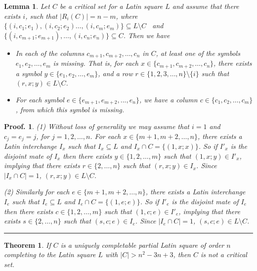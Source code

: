 \documentclass[12pt]{report}
\newtheorem{theorem}{Theorem}
\newtheorem{lemma}{Lemma}
\newtheorem{preproof}{{\bf Proof.}}
\newenvironment{proof}[1]{\begin{preproof}{\rm
               #1}\hfill{\rule[-0.5mm]{2mm}{2mm}}}{\end{preproof}}
\begin{document}
\begin{lemma}
\label{3.2}
Let $C$ be a critical set for a Latin square $L$ and assume that
there exists $i$, such that
$|R_i(C)| = n-m$, where
$\{(i, c_1; e_1), (i, c_2; e_2)\dots, (i, c_m; e_m) \}
\subseteq L\setminus C$ \  and
$\{(i,c_{m+1};e_{m+1}), \dots, (i, c_n; e_n) \}\subseteq  C$.
Then we have
\begin{itemize}
%
\item[$(1)$]
In each of the columns $c_{m+1},c_{m+2}, \dots, c_n$ in $C$, at least
one of the symbols $e_1, e_2, \dots, e_m$ is missing.
That is, for each $x \in \{c_{m+1}, c_{m+2}, \dots, c_n \}$,
there exists a symbol $y \in \{e_1, e_2, \dots, e_m \}$, and a row
$r \in \{1,2, 3, \dots, n \}\setminus \{i\}$
such that $(r, x; y)  \in L\setminus C$.
%
\item[$(2)$]
For each symbol $e \in \{e_{m+1},e_{m+2}, ..., e_n\}$, we have
a column $c \in \{c_1, c_2, \dots, c_m \}$, from which
this symbol is missing.
\end{itemize}
\end{lemma}
%
\begin{proof}{(1)
Without loss of generality we may assume that $i=1$ and $c_j = e_j = j$, for
$j = 1,2, \dots, n$.
For each $x \in \{m+1, m+2, \dots, n \}$,
there exists a Latin interchange $I_x$ such that
$I_x\subseteq L$ and $I_x \cap C = \{ (1, x;x) \}$.
So if $I'_x$ is the disjoint mate of $I_x$ then there exists
$y \in \{1, 2, \dots, m \}$ such that $(1,x;y) \in I'_x$, implying that
there exists $r \in \{ 2, \dots, n \}$ such that $(r,x;y) \in I_x$.
Since $|I_x \cap C| = 1$, $(r,x;y) \in L\setminus C$.

\noindent
(2) Similarly
for each $e \in \{m+1, m+2, \dots, n \}$,
there exists a Latin interchange $I_e$ such that
$I_e\subseteq L$ and $I_e \cap C = \{ (1, e;e) \}$.
So if $I'_e$ is the disjoint mate of $I_e$ then there exists
$c \in \{1, 2, \dots, m \}$ such that $(1,c;e) \in I'_e$, implying that
there exists $s \in \{ 2, \dots, n \}$ such that $(s,c;e) \in I_e$.
Since $|I_e \cap C| = 1$, $(s,c;e) \in L\setminus C$.
}\end{proof}
%
\begin{theorem}
\label{th3.1}
If $C$ is a uniquely completable partial Latin square of order $n$
completing to the Latin square $L$
with $| C | > n^2-3n+3$, then $C$ is not a critical set.
\end{theorem}
\end{document}
